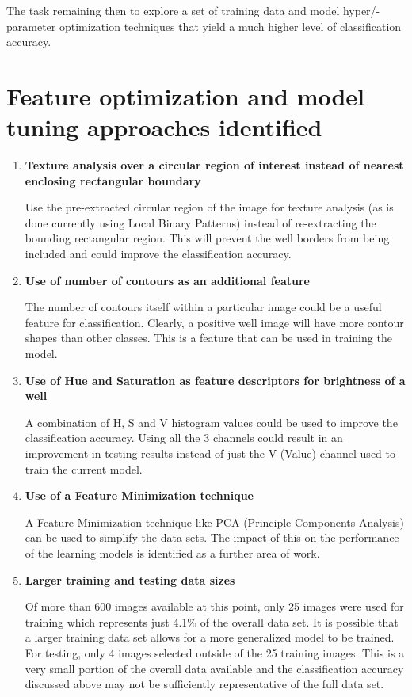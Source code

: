 \documentclass[a4paper,twoside,12pt]{report}
\begin{document}
The task remaining then to explore a set of training data and model hyper/-parameter optimization techniques that yield a much higher level of classification accuracy. 

\section{Feature optimization and model tuning approaches identified}

\begin{enumerate}

\item  \textbf{Texture analysis over a circular region of interest instead of nearest enclosing rectangular boundary}

Use the pre-extracted circular region of the image for texture analysis (as is done currently using Local Binary Patterns) instead of re-extracting the bounding rectangular region.   This will prevent the well borders from being included and could improve the classification accuracy. 

\item \textbf{Use of number of contours as an additional feature}

The number of contours itself within a particular image could be a useful feature for classification.   Clearly, a positive well image will have more contour shapes than other classes.   This is a feature that can be used in training the model.  

\item  \textbf{Use of Hue and Saturation as feature descriptors for brightness of a well}

A combination of H, S and V histogram values could be used to improve the classification accuracy.   Using all the 3 channels could result in an improvement in testing results instead of just the V (Value) channel used to train the current model.    

\item  \textbf{Use of a Feature Minimization technique }

A Feature Minimization technique like PCA (Principle Components Analysis) can be used to simplify the data sets.  The impact of this on the performance of the learning models is identified as a further area of work. 

\item  \textbf{ Larger training and testing data sizes }

Of more than 600 images available at this point, only 25 images were used for training which represents just 4.1\% of the overall data set.  It is possible that a larger training data set allows for a more generalized model to be trained.    For testing, only 4 images selected outside of the 25 training images.  This is a very small portion of the overall data available and the classification accuracy discussed above may not be sufficiently representative of the full data set.  


\end{enumerate}
\end{document}

